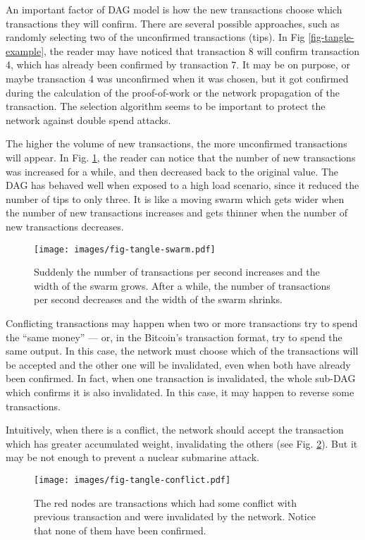 An important factor of DAG model is how the new transactions choose which transactions they will confirm. There are several possible approaches, such as randomly selecting two of the unconfirmed transactions (tips). In Fig \ref{fig-tangle-example}, the reader may have noticed that transaction 8 will confirm transaction 4, which has already been confirmed by transaction 7. It may be on purpose, or maybe transaction 4 was unconfirmed when it was chosen, but it got confirmed during the calculation of the proof-of-work or the network propagation of the transaction. The selection algorithm seems to be important to protect the network against double spend attacks.

The higher the volume of new transactions, the more unconfirmed transactions will appear. In Fig. \ref{fig-tangle-swarm}, the reader can notice that the number of new transactions was increased for a while, and then decreased back to the original value. The DAG has behaved well when exposed to a high load scenario, since it reduced the number of tips to only three. It is like a moving swarm which gets wider when the number of new transactions increases and gets thinner when the number of new transactions decreases.

\begin{figure}[ht]
\centering\texttt{[image: images/fig-tangle-swarm.pdf]}
\caption{Suddenly the number of transactions per second increases and the width of the swarm grows. After a while, the number of transactions per second decreases and the width of the swarm shrinks.\label{fig-tangle-swarm}}
\end{figure}

Conflicting transactions may happen when two or more transactions try to spend the ``same money'' --- or, in the Bitcoin's transaction format, try to spend the same output. In this case, the network must choose which of the transactions will be accepted and the other one will be invalidated, even when both have already been confirmed. In fact, when one transaction is invalidated, the whole sub-DAG which confirms it is also invalidated. In this case, it may happen to reverse some transactions.

Intuitively, when there is a conflict, the network should accept the transaction which has greater accumulated weight, invalidating the others (see Fig. \ref{fig-tangle-conflict}). But it may be not enough to prevent a nuclear submarine attack.

\begin{figure}[ht]
\centering\texttt{[image: images/fig-tangle-conflict.pdf]}
\caption{The red nodes are transactions which had some conflict with previous transaction and were invalidated by the network. Notice that none of them have been confirmed.\label{fig-tangle-conflict}}
\end{figure}

